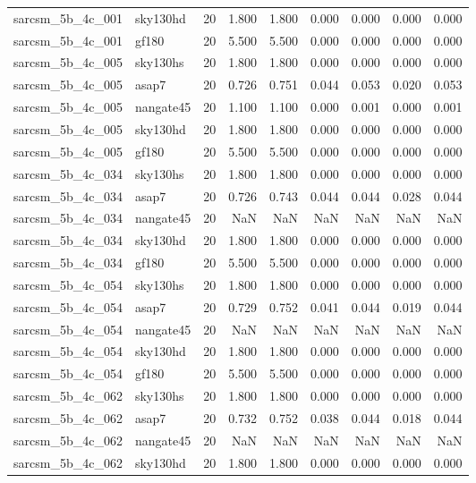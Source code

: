 \begin{tabular}{llrrrrrrr}
sarcsm\_5b\_4c\_001 & sky130hd & 20 & 1.800 & 1.800 & 0.000 & 0.000 & 0.000 & 0.000 \\
sarcsm\_5b\_4c\_001 & gf180 & 20 & 5.500 & 5.500 & 0.000 & 0.000 & 0.000 & 0.000 \\
sarcsm\_5b\_4c\_005 & sky130hs & 20 & 1.800 & 1.800 & 0.000 & 0.000 & 0.000 & 0.000 \\
sarcsm\_5b\_4c\_005 & asap7 & 20 & 0.726 & 0.751 & 0.044 & 0.053 & 0.020 & 0.053 \\
sarcsm\_5b\_4c\_005 & nangate45 & 20 & 1.100 & 1.100 & 0.000 & 0.001 & 0.000 & 0.001 \\
sarcsm\_5b\_4c\_005 & sky130hd & 20 & 1.800 & 1.800 & 0.000 & 0.000 & 0.000 & 0.000 \\
sarcsm\_5b\_4c\_005 & gf180 & 20 & 5.500 & 5.500 & 0.000 & 0.000 & 0.000 & 0.000 \\
sarcsm\_5b\_4c\_034 & sky130hs & 20 & 1.800 & 1.800 & 0.000 & 0.000 & 0.000 & 0.000 \\
sarcsm\_5b\_4c\_034 & asap7 & 20 & 0.726 & 0.743 & 0.044 & 0.044 & 0.028 & 0.044 \\
sarcsm\_5b\_4c\_034 & nangate45 & 20 & NaN & NaN & NaN & NaN & NaN & NaN \\
sarcsm\_5b\_4c\_034 & sky130hd & 20 & 1.800 & 1.800 & 0.000 & 0.000 & 0.000 & 0.000 \\
sarcsm\_5b\_4c\_034 & gf180 & 20 & 5.500 & 5.500 & 0.000 & 0.000 & 0.000 & 0.000 \\
sarcsm\_5b\_4c\_054 & sky130hs & 20 & 1.800 & 1.800 & 0.000 & 0.000 & 0.000 & 0.000 \\
sarcsm\_5b\_4c\_054 & asap7 & 20 & 0.729 & 0.752 & 0.041 & 0.044 & 0.019 & 0.044 \\
sarcsm\_5b\_4c\_054 & nangate45 & 20 & NaN & NaN & NaN & NaN & NaN & NaN \\
sarcsm\_5b\_4c\_054 & sky130hd & 20 & 1.800 & 1.800 & 0.000 & 0.000 & 0.000 & 0.000 \\
sarcsm\_5b\_4c\_054 & gf180 & 20 & 5.500 & 5.500 & 0.000 & 0.000 & 0.000 & 0.000 \\
sarcsm\_5b\_4c\_062 & sky130hs & 20 & 1.800 & 1.800 & 0.000 & 0.000 & 0.000 & 0.000 \\
sarcsm\_5b\_4c\_062 & asap7 & 20 & 0.732 & 0.752 & 0.038 & 0.044 & 0.018 & 0.044 \\
sarcsm\_5b\_4c\_062 & nangate45 & 20 & NaN & NaN & NaN & NaN & NaN & NaN \\
sarcsm\_5b\_4c\_062 & sky130hd & 20 & 1.800 & 1.800 & 0.000 & 0.000 & 0.000 & 0.000 \\

\end{tabular}
